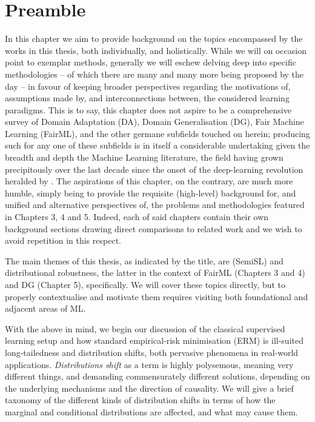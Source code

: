\section{Preamble}
\noindent
%
In this chapter we aim to provide background on the topics encompassed by the works in this thesis,
both individually, and holistically.
%
While we will on occasion point to exemplar methods, generally we will eschew delving deep into
specific methodologies -- of which there are many and many more being proposed by the day -- in
favour of keeping broader perspectives regarding the motivations of, assumptions made by, and
interconnections between, the considered learning paradigms. 
%
This is to say, this chapter does not aspire to be a comprehensive survey of Domain Adaptation
(DA), Domain Generalisation (DG), Fair Machine Learning (FairML), and the other germane subfields
touched on herein; producing such for any one of these subfields is in itself a considerable
undertaking given the breadth and depth the Machine Learning literature, the field having grown
precipitously over the last decade since the onset of the deep-learning revolution heralded by
\cite{Krizhevsky2012imagenet}.
%
The aspirations of this chapter, on the contrary, are much more humble, simply being to provide the
requisite (high-level) background for, and unified and alternative perspectives of, the problems
and methodologies featured in Chapters 3, 4 and 5.
%
Indeed, each of said chapters contain their own background sections drawing direct comparisons to
related work and we wish to avoid repetition in this respect.

The main themes of this thesis, as indicated by the title, are (SemiSL) and distributional
robustness, the latter in the context of FairML (Chapters 3 and 4) and DG (Chapter 5),
specifically. 
%
We will cover these topics directly, but to properly contextualise and motivate them requires
visiting both foundational and adjacent areas of ML.

%
With the above in mind, we begin our discussion of the classical supervised learning setup and how
standard empirical-risk minimisation (ERM) is ill-suited long-tailedness and distribution shifts,
both pervasive phenomena in real-world applications. \emph{Distributions shift} as a term is highly
polysemous, meaning very different things, and demanding commensurately different solutions,
depending on the underlying mechanisms and the direction of causality. We will give a brief
taxonomy of the different kinds of distribution shifts in terms of how the marginal and conditional
distributions are affected, and what may cause them. 

